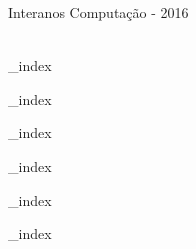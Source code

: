 \documentclass[a4paper,12pt]{article}
\begin{document}


\begin{center}

{\Huge Interanos Computação - 2016} \\
{\LARGE \Modality} \\ [1.5cm]

\end{center}



{_index}


{_index}


{_index}


\ifteams
	{_index}
\fi


{_index}


{_index}

\end{document}
